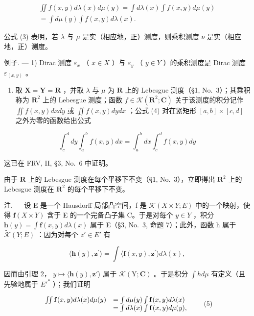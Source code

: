\[
\begin{array}{c} \iint f (x, y) d \lambda (x) d \mu (y) = \int d \lambda (x) \int f (x, y) d \mu (y) \\ = \int d \mu (y) \int f (x, y) d \lambda (x). \end{array}\tag{4}
\]

公式 (3) 表明，若 \(\lambda\) 与 \(\mu\) 是实（相应地，正）测度，则乘积测度 \(\nu\) 是实（相应地，正）测度。

例子. --- 1) Dirac 测度 \(\varepsilon_{x}\) （ \(x \in X\) ）与 \(\varepsilon_{y}\) （ \(y \in Y\) ）的乘积测度是 Dirac 测度 \(\varepsilon_{(x,y)}\) 。

\begin{enumerate}
\def\labelenumi{\arabic{enumi})}
\setcounter{enumi}{1}
\tightlist
\item
  取 \(\mathbf{X} = \mathbf{Y} = \mathbf{R}\) ，并取 \(\lambda\) 与 \(\mu\) 为 \(\mathbf{R}\) 上的 Lebesgue 测度（§1, No.~3）；其乘积称为 \(\mathbf{R}^2\) 上的 Lebesgue 测度；函数 \(f \in \mathcal{K}(\mathbf{R}^2; \mathbf{C})\) 关于该测度的积分记作 \(\iint f(x, y) dx dy\) 或 \(\iint f(x, y) dy dx\) ；公式 (4) 对在紧矩形 \([a, b] \times [c, d]\) 之外为零的函数给出公式
\end{enumerate}

\[
\int_ {c} ^ {d} d y \int_ {a} ^ {b} f (x, y) d x = \int_ {a} ^ {b} d x \int_ {c} ^ {d} f (x, y) d y
\]

这已在 FRV, II, §3, No.~6 中证明。

由于 \(\mathbf{R}\) 上的 Lebesgue 测度在每个平移下不变（§1, No.~3），立即得出 \(\mathbf{R}^2\) 上的 Lebesgue 测度在 \(\mathbf{R}^2\) 的每个平移下不变。

注. --- 设 E 是一个 Hausdorff 局部凸空间，f 是 \(\mathcal{K}(X \times Y; E)\) 中的一个映射，使得 \(\mathbf{f}(X \times Y)\) 含于 E 的一个完备凸子集 C。于是对每个 \(y \in Y\) ，积分 \(\mathbf{h}(y) = \int \mathbf{f}(x, y) d\lambda(x)\) 属于 E（§3, No.~3, 命题 7）；此外，函数 h 属于 \(\widetilde{\mathcal{K}}(Y; E)\) ：因为对每个 \(z' \in E'\) 有

\[
\langle \mathbf {h} (y), \mathbf {z} ^ {\prime} \rangle = \int \langle \mathbf {f} (x, y), \mathbf {z} ^ {\prime} \rangle d \lambda (x),
\]

因而由引理 2， \(y \mapsto \langle \mathbf{h}(y), \mathbf{z}' \rangle\) 属于 \(\mathcal{K}(\mathrm{Y}; \mathbf{C})\) 。于是积分 \(\int h d\mu\) 有定义（且先验地属于 \(E'^{*}\) ）；我们证明

\[
\begin{array}{r l} \iint \mathbf {f} (x, y) d \lambda (x) d \mu (y) & = \int d \mu (y) \int \mathbf {f} (x, y) d \lambda (x) \\ & = \int d \lambda (x) \int \mathbf {f} (x, y) d \mu (y), \end{array}\tag{5}
\]

